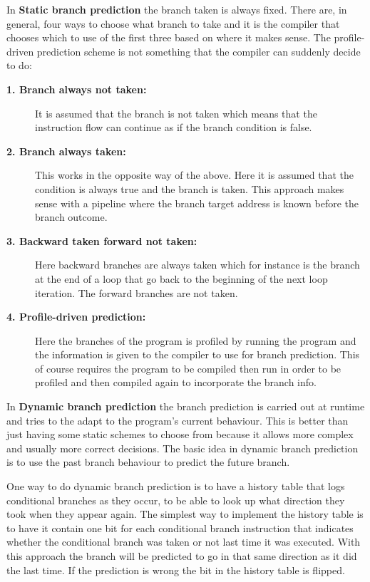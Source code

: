 In \textbf{Static branch prediction} the branch taken is always fixed.
There are, in general, four ways to choose what branch to take and it is the compiler that chooses which to use of the first three based on where it makes sense. 
The profile-driven prediction scheme is not something that the compiler can suddenly decide to do:
\begin{description}
\item[\textbf{1. Branch always not taken:}] It is assumed that the branch is not taken which means that the instruction flow can continue as if the branch condition is false.

\item[\textbf{2. Branch always taken:}] This works in the opposite way of the above. Here it is assumed that the condition is always true and the branch is taken. This approach makes sense with a pipeline where the branch target address is known before the branch outcome.

\item[\textbf{3. Backward taken forward not taken:}] Here backward branches are always taken which for instance is the branch at the end of a loop that go back to the beginning of the next loop iteration.
The forward branches are not taken. 

\item[\textbf{4. Profile-driven prediction:}]
Here the branches of the program is profiled by running the program and the information is given to the compiler to use for branch prediction. This of course requires the program to be compiled then run in order to be profiled and then compiled again to incorporate the branch info.
\end{description}

In \textbf{Dynamic branch prediction} the branch prediction is carried out at runtime and tries to the adapt to the program's current behaviour.
This is better than just having some static schemes to choose from because it allows more complex and usually more correct decisions.
The basic idea in dynamic branch prediction is to use the past branch behaviour to predict the future branch.

One way to do dynamic branch prediction is to have a history table that logs conditional branches as they occur, to be able to look up what direction they took when they appear again.
The simplest way to implement the history table is to have it contain one bit for each conditional branch instruction that indicates whether the conditional branch was taken or not last time it was executed.
With this approach the branch will be predicted to go in that same direction as it did the last time. 
If the prediction is wrong the bit in the history table is flipped.

